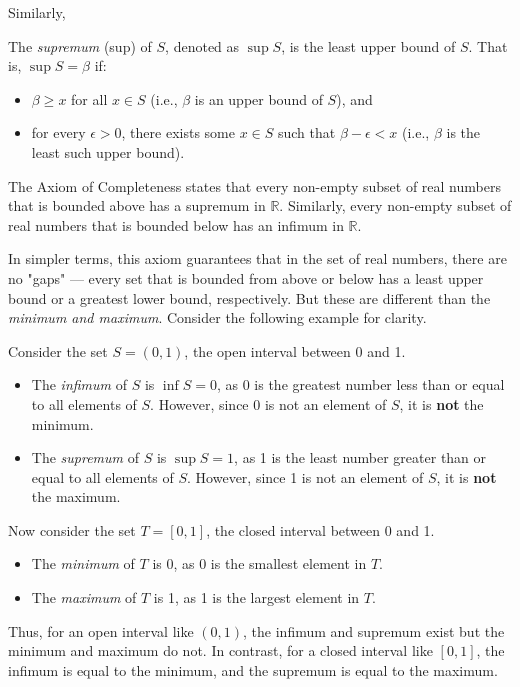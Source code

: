 Similarly, 

\begin{definition}
    The \textit{supremum} (sup) of $S$, denoted as $\sup S$, is the least upper bound of $S$. That is, $\sup S = \beta$ if:
\begin{itemize}
    \item $\beta \geq x$ for all $x \in S$ (i.e., $\beta$ is an upper bound of $S$), and
    \item for every $\epsilon > 0$, there exists some $x \in S$ such that $\beta - \epsilon < x$ (i.e., $\beta$ is the least such upper bound).
\end{itemize}
\end{definition}

\begin{definition}
    The Axiom of Completeness states that every non-empty subset of real numbers that is bounded above has a supremum in $\mathbb{R}$. Similarly, every non-empty subset of real numbers that is bounded below has an infimum in $\mathbb{R}$.
\end{definition}

In simpler terms, this axiom guarantees that in the set of real numbers, there are no "gaps" — every set that is bounded from above or below has a least upper bound or a greatest lower bound, respectively. But these are different than the \textit{minimum and maximum}. Consider the following example for clarity.\\

\begin{example}
    Consider the set $S = (0, 1)$, the open interval between 0 and 1.
\begin{itemize}
    \item The \textit{infimum} of $S$ is $\inf S = 0$, as 0 is the greatest number less than or equal to all elements of $S$. However, since 0 is not an element of $S$, it is \textbf{not} the minimum.
    \item The \textit{supremum} of $S$ is $\sup S = 1$, as 1 is the least number greater than or equal to all elements of $S$. However, since 1 is not an element of $S$, it is \textbf{not} the maximum.
\end{itemize}

Now consider the set $T = [0, 1]$, the closed interval between 0 and 1.
\begin{itemize}
    \item The \textit{minimum} of $T$ is 0, as 0 is the smallest element in $T$.
    \item The \textit{maximum} of $T$ is 1, as 1 is the largest element in $T$.
\end{itemize}

Thus, for an open interval like $(0, 1)$, the infimum and supremum exist but the minimum and maximum do not. In contrast, for a closed interval like $[0, 1]$, the infimum is equal to the minimum, and the supremum is equal to the maximum.
\end{example}

